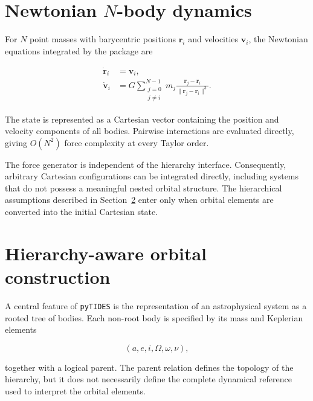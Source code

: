 \documentclass[11pt]{article}
\begin{document}
\section{Newtonian $N$-body dynamics}
\label{sec:nbody}

For $N$ point masses with barycentric positions $\bm r_i$ and velocities
$\bm v_i$, the Newtonian equations integrated by the package are

\begin{align}
    \dot{\bm r}_i &= \bm v_i,\\
    \dot{\bm v}_i &=
    G\sum_{\substack{j=0\\j\neq i}}^{N-1}
    m_j
    \frac{\bm r_j-\bm r_i}
    {\lVert\bm r_j-\bm r_i\rVert^3}.
    \label{eq:nbody}
\end{align}

The state is represented as a Cartesian vector containing the position and
velocity components of all bodies. Pairwise interactions are evaluated
directly, giving $O(N^2)$ force complexity at every Taylor order.

The force generator is independent of the hierarchy interface. Consequently,
arbitrary Cartesian configurations can be integrated directly, including
systems that do not possess a meaningful nested orbital structure. The
hierarchical assumptions described in Section~\ref{sec:hierarchy} enter only
when orbital elements are converted into the initial Cartesian state.


\section{Hierarchy-aware orbital construction}
\label{sec:hierarchy}

A central feature of \texttt{pyTIDES} is the representation of an
astrophysical system as a rooted tree of bodies. Each non-root body is
specified by its mass and Keplerian elements

\begin{equation}
    (a,e,i,\Omega,\omega,\nu),
\end{equation}

together with a logical parent. The parent relation defines the topology of
the hierarchy, but it does not necessarily define the complete dynamical
reference used to interpret the orbital elements.
\end{document}
